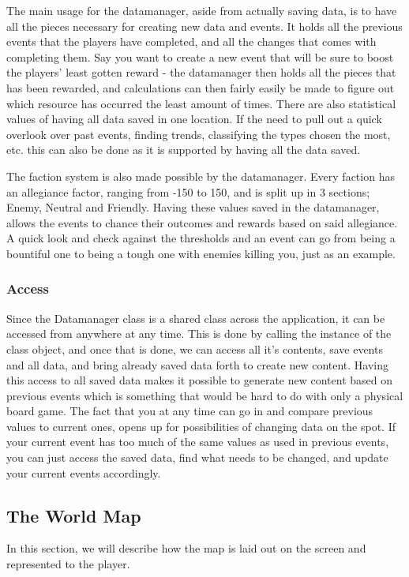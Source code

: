 The main usage for the datamanager, aside from actually saving data, is to have all the pieces necessary for creating new data and events. It holds all the previous events that the players have completed, and all the changes that comes with completing them. Say you want to create a new event that will be sure to boost the players' least gotten reward - the datamanager then holds all the pieces that has been rewarded, and calculations can then fairly easily be made to figure out which resource has occurred the least amount of times.
There are also statistical values of having all data saved in one location. If the need to pull out a quick overlook over past events, finding trends, classifying the types chosen the most, etc. this can also be done as it is supported by having all the data saved.

The faction system is also made possible by the datamanager. Every faction has an allegiance factor, ranging from -150 to 150, and is split up in 3 sections; Enemy, Neutral and Friendly. Having these values saved in the datamanager, allows the events to chance their outcomes and rewards based on said allegiance. A quick look and check against the thresholds and an event can go from being a bountiful one to being a tough one with enemies killing you, just as an example.


\subsubsection{Access}
Since the Datamanager class is a shared class across the application, it can be accessed from anywhere at any time. This is done by calling the instance of the class object, and once that is done, we can access all it's contents, save events and all data, and bring already saved data forth to create new content. Having this access to all saved data makes it possible to generate new content based on previous events which is something that would be hard to do with only a physical board game. 
The fact that you at any time can go in and compare previous values to current ones, opens up for possibilities of changing data on the spot. If your current event has too much of the same values as used in previous events, you can just access the saved data, find what needs to be changed, and update your current events accordingly.	

\subsection{The World Map}
In this section, we will describe how the map is laid out on the screen and represented to the player.

